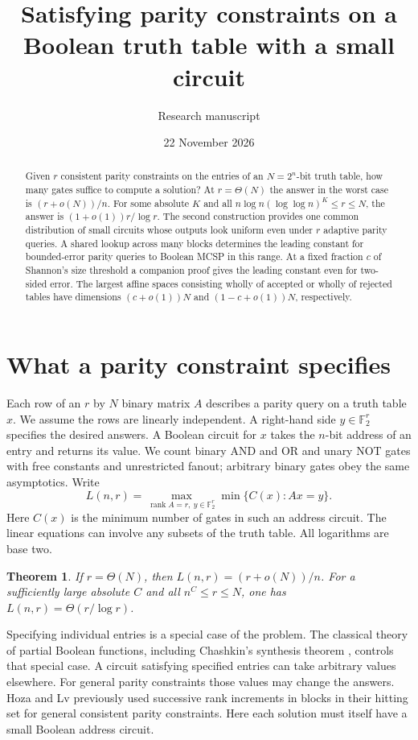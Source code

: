 \documentclass[11pt]{article}
\title{Satisfying parity constraints on a Boolean truth table with a small circuit}
\author{Research manuscript}\date{22 November 2026}
\newtheorem{theorem}{Theorem}[section]
\newcommand{\F}{\mathbb F_2}
\begin{document}
\maketitle
\begin{abstract}
Given $r$ consistent parity constraints on the entries of an $N=2^n$-bit truth table, how many gates suffice to compute a solution? At $r=\Theta(N)$ the answer in the worst case is $(r+o(N))/n$. For some absolute $K$ and all $n\log n(\log\log n)^K\le r\le N$, the answer is $(1+o(1))r/\log r$. The second construction provides one common distribution of small circuits whose outputs look uniform even under $r$ adaptive parity queries. A shared lookup across many blocks determines the leading constant for bounded-error parity queries to Boolean MCSP in this range. At a fixed fraction $c$ of Shannon's size threshold a companion proof gives the leading constant even for two-sided error. The largest affine spaces consisting wholly of accepted or wholly of rejected tables have dimensions $(c+o(1))N$ and $(1-c+o(1))N$, respectively.
\end{abstract}

\section{What a parity constraint specifies}
Each row of an $r$ by $N$ binary matrix $A$ describes a parity query on a truth table $x$. We assume the rows are linearly independent. A right-hand side $y\in\F^r$ specifies the desired answers. A Boolean circuit for $x$ takes the $n$-bit address of an entry and returns its value. We count binary AND and OR and unary NOT gates with free constants and unrestricted fanout; arbitrary binary gates obey the same asymptotics. Write
\[
 L(n,r)=\max_{\operatorname{rank}A=r,\ y\in\F^r}
             \min\{ C(x): Ax=y\}.
\]
Here $C(x)$ is the minimum number of gates in such an address circuit. The linear equations can involve any subsets of the truth table. All logarithms are base two.
\begin{theorem}\label{th:sharp}
If $r=\Theta(N)$, then $L(n,r)=(r+o(N))/n$. For a sufficiently large absolute $C$ and all $n^C\le r\le N$, one has $L(n,r)=\Theta(r/\log r)$.
\end{theorem}
Specifying individual entries is a special case of the problem. The classical theory of partial Boolean functions, including Chashkin's synthesis theorem \cite{chash}, controls that special case. A circuit satisfying specified entries can take arbitrary values elsewhere. For general parity constraints those values may change the answers. Hoza and Lv \cite[Corollary 32]{hl} previously used successive rank increments in blocks in their hitting set for general consistent parity constraints. Here each solution must itself have a small Boolean address circuit.
\end{document}
